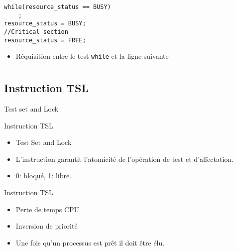 \begin{frame}[containsverbatim]{\sectitle}
\begin{exampleblock}{\subsectitle}
\begin{verbatim}
while(resource_status == BUSY)
    ;
resource_status = BUSY;
//Critical section
resource_status = FREE;
\end{verbatim}
\end{exampleblock}

\begin{alertblock}{\subsectitle}
\begin{itemize}
\item Réquisition entre le test \texttt{while} et la ligne suivante
\end{itemize}
\end{alertblock}
\end{frame}
\def\sectitle{Test set and Lock}
\section{\subsectitle}
\def\subsectitle{Instruction TSL}
\subsection{\subsectitle}
\begin{frame}[containsverbatim]{\sectitle}
\begin{block}{\subsectitle}
\begin{itemize}
    \item Test Set and Lock
    \item L'instruction garantit l'atomicité de l'opération de test et
    d'affectation.
    \item 0: bloqué, 1: libre.
\end{itemize}
\end{block}

\begin{block}{\subsectitle}
\begin{itemize}
\item Perte de temps CPU
\item Inversion de priorité
\item Une fois qu'un processus est prêt il doit être élu.
\end{itemize}
\end{block}
\end{frame}

